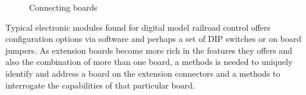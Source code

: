 \begin{figure}[htbp]
    \centering
    \caption{Connecting boards}
\end{figure}

Typical electronic modules found for digital model railroad control offers configuration options via software and perhaps a set of DIP switches or on board jumpers. As extension boards become more rich in the features they offers and also the combination of more than one board, a methods is needed to uniquely identify and address a board on the extension connectors and a methods to interrogate the capabilities of that particular board.

